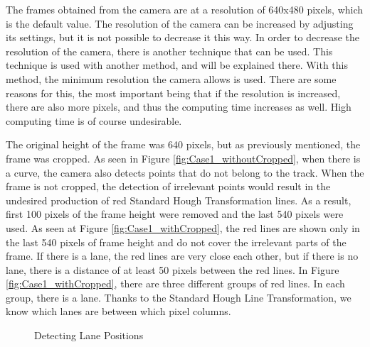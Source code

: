The frames obtained from the camera are at a resolution of 640x480 pixels, which is the default value. The resolution of the camera can be increased by adjusting its settings, but it is not possible to decrease it this way. In order to decrease the resolution of the camera, there is another technique that can be used. This technique is used with another method, and will be explained there. With this method, the minimum resolution the camera allows is used. There are some reasons for this, the most important being that if the resolution is increased, there are also more pixels, and thus the computing time increases as well. High computing time is of course undesirable.
 
The original height of the frame was 640 pixels, but as previously mentioned, the frame was cropped. As seen in Figure \ref{fig:Case1_withoutCropped}, when there is a curve, the camera also detects points that do not belong to the track. When the frame is not cropped, the detection of irrelevant points would result in the undesired production of red Standard Hough Transformation lines. As a result, first 100 pixels of the frame height were removed and the last 540 pixels were used. As seen at Figure \ref{fig:Case1_withCropped}, the red lines are shown only in the last 540 pixels of frame height and do not cover the irrelevant parts of the frame. If there is a lane, the red lines are very close each other, but if there is no lane, there is a distance of at least 50 pixels between the red lines. In Figure \ref{fig:Case1_withCropped}, there are three different groups of red lines. In each group, there is a lane. Thanks to the Standard Hough Line Transformation, we know which lanes are between which pixel columns.

\begin{figure}[H]
  \centering
  \hfill
  \caption{Detecting Lane Positions}
\end{figure}


